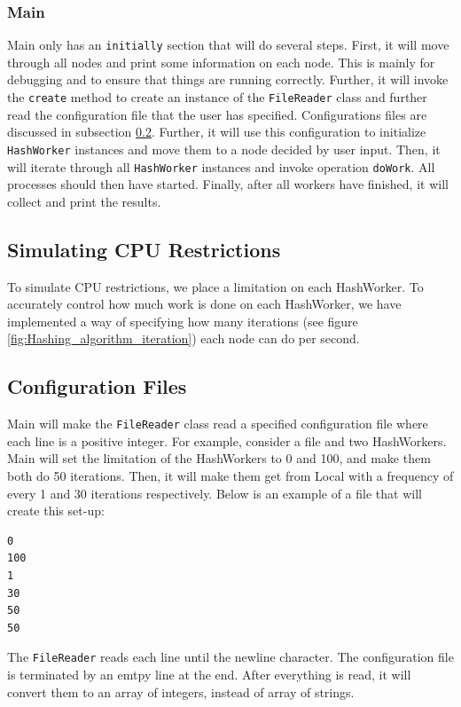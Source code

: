 \subsubsection{Main}
Main only has an \verb|initially| section that will do several steps. First, it will move through all nodes and print some information on each node. This is mainly for debugging and to ensure that things are running correctly. Further, it will invoke the \verb|create| method to create an instance of the \verb|FileReader| class and further read the configuration file that the user has specified. Configurations files are discussed in subsection \ref{subsection:configfiles}. Further, it will use this configuration to initialize \verb|HashWorker| instances and move them to a node decided by user input. Then, it will iterate through all \verb|HashWorker| instances and invoke operation \verb|doWork|. All processes should then have started. Finally, after all workers have finished, it will collect and print the results.



\subsection{Simulating CPU Restrictions}
To simulate CPU restrictions, we place a limitation on each HashWorker. To accurately control how much work is done on each HashWorker, we have implemented a way of specifying how many iterations (see figure \ref{fig:Hashing_algorithm_iteration}) each node can do per second.



\subsection{Configuration Files}\label{subsection:configfiles}
Main will make the \verb|FileReader| class read a specified configuration file where each line is a positive integer. For example, consider a file and two HashWorkers. Main will set the limitation of the HashWorkers to 0 and 100, and make them both do 50 iterations. Then, it will make them get from Local with a frequency of every 1 and 30 iterations respectively. Below is an example of a file that will create this set-up:
\begin{lstlisting}
0
100
1
30
50
50

\end{lstlisting}

The \verb|FileReader| reads each line until the newline character. The configuration file is terminated by an emtpy line at the end. After everything is read, it will convert them to an array of integers, instead of array of strings. 

